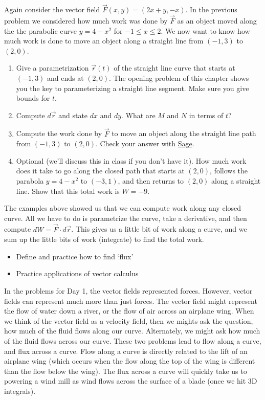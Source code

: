 \begin{problem}
 Again consider the vector field $\vec F(x,y) = (2x+y,-x)$. In the previous problem we considered how much work was done by $\vec F$ as an object moved along the the parabolic curve $y=4-x^2$ for $-1\leq x\leq 2$. We now want to know how much work is done to move an object along a straight line from $(-1,3)$ to $(2,0)$.    
\begin{enumerate}
 \item Give a parametrization $\vec r(t)$ of the straight line curve that starts at $(-1,3)$ and ends at $(2,0)$. The opening problem of this chapter shows you the key to parameterizing a straight line segment.  Make sure you give bounds for $t$. 
 \item Compute $d\vec r$ and state $dx$ and $dy$. What are $M$ and $N$ in terms of $t$?
 \item Compute the work done by $\vec F$ to move an object along the straight line path from $(-1,3)$ to $(2,0)$. Check your answer with \href{\sageworkurl}{Sage}. 
 \item Optional (we'll discuss this in class if you don't have it).  How much work does it take to go along the closed path that starts at $(2,0)$, follows the parabola $y=4-x^2$ to $(-3,1)$, and then returns to $(2,0)$ along a straight line. Show that this total work is $W=-9$.   
\end{enumerate}
\end{problem}


The examples above showed us that we can compute work along any closed curve.  All we have to do is parametrize the curve, take a derivative, and then compute $dW = \vec F \cdot d\vec r$. This gives us a little bit of work along a curve, and we sum up the little bits of work (integrate) to find the total work. 

\newpage
\uday
\normalsize
\begin{itemize}
\item Define and practice how to find `flux'
\item Practice applications of vector calculus
\end{itemize}
\vskip0.2in

In the problems for Day 1, the vector fields represented forces. However, vector fields can represent much more than just forces. The vector field might represent the flow of water down a river, or the flow of air across an airplane wing.  When we think of the vector field as a velocity field, then we mights ask the question, how much of the fluid flows along our curve. Alternately, we might ask how much of the fluid flows across our curve.  These two problems lead to flow along a curve, and flux across a curve. Flow along a curve is directly related to the lift of an airplane wing (which occurs when the flow along the top of the wing is different than the flow below the wing).  The flux across a curve will quickly take us to powering a wind mill as wind flows across the surface of a blade (once we hit 3D integrals).


